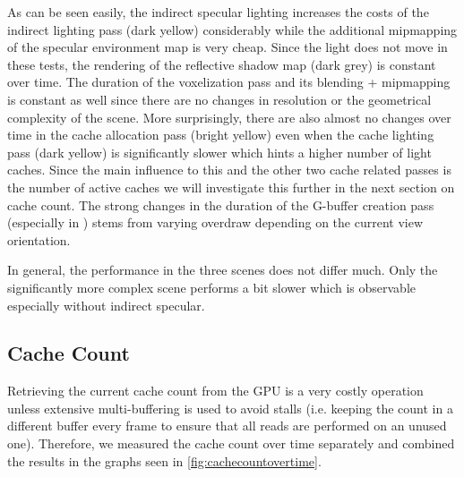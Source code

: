 \documentclass[thesis.tex]{subfiles}
\begin{document}
As can be seen easily, the indirect specular lighting increases the costs of the indirect lighting pass (dark yellow) considerably while the additional mipmapping of the specular environment map is very cheap.
Since the light does not move in these tests, the rendering of the reflective shadow map (dark grey) is constant over time.
The duration of the voxelization pass and its blending + mipmapping is constant as well since there are no changes in resolution or the geometrical complexity of the scene.
More surprisingly, there are also almost no changes over time in the cache allocation pass (bright yellow) even when the cache lighting pass (dark yellow) is significantly slower which hints a higher number of light caches.
Since the main influence to this and the other two cache related passes is the number of active caches we will investigate this further in the next section on cache count. 
The strong changes in the duration of the G-buffer creation pass (especially in ) stems from varying overdraw depending on the current view orientation.

In general, the performance in the three scenes does not differ much.
Only the significantly more complex  scene performs a bit slower which is observable especially without indirect specular.

\subsection{Cache Count}
Retrieving the current cache count from the GPU is a very costly operation unless extensive multi-buffering is used to avoid stalls (i.e. keeping the count in a different buffer every frame to ensure that all reads are performed on an unused one).
Therefore, we measured the cache count over time separately and combined the results in the graphs seen in \autoref{fig:cachecountovertime}.
\end{document}
